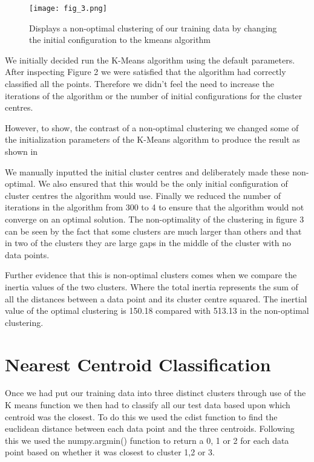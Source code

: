 \documentclass[A4Page,11pt]{article}
\begin{document}
\begin{figure}[h!]
\centering
\texttt{[image: fig\_3.png]}
\caption{\label{fig 1:}Displays a non-optimal clustering of our training data by changing the initial configuration to the kmeans algorithm}
\end{figure}

We initially decided run the K-Means algorithm using the default parameters. After inspecting Figure 2 we were satisfied that the algorithm had correctly classified all the points. Therefore we didn’t feel the need to increase the iterations of the algorithm or the number of initial configurations for the cluster centres. \par

However, to show, the contrast of a non-optimal clustering we changed some of the initialization parameters of the K-Means algorithm to produce the result as shown in  \par

We manually inputted the initial cluster centres and deliberately made these non-optimal. We also ensured that this would be the only initial configuration of cluster centres the algorithm would use. Finally we reduced the number of iterations in the algorithm from 300 to 4 to ensure that the algorithm would not converge on an optimal solution. The non-optimality of the clustering in figure 3 can be seen by the fact that some clusters are much larger than others and that in two of the clusters they are large gaps in the middle of the cluster with no data points. \par

Further evidence that this is non-optimal clusters comes when we compare the inertia values of the two clusters. Where the total inertia represents the sum of all the distances between a data point and its cluster centre squared. The inertial value of the optimal clustering is 150.18 compared with 513.13 in the non-optimal clustering.


\section{Nearest Centroid Classification}
Once we had put our training data into three distinct clusters through use of the K means function we then had to classify all our test data based upon which centroid was the closest. To do this we used the cdist function to find the euclidean distance between each data point and the three centroids. Following this we used the numpy.argmin() function to return a 0, 1 or 2 for each data point based on whether it was closest to cluster 1,2 or 3.\par 
\end{document}

